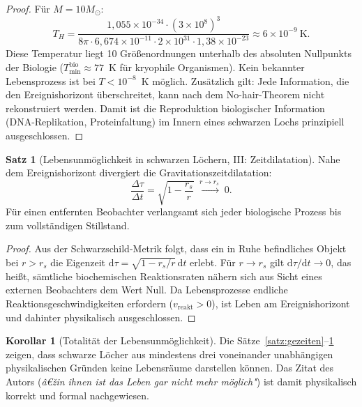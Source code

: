 ﻿\documentclass[a4paper,12pt]{article}
\theoremstyle{definition}
\newtheorem{satz}{Satz}
\newtheorem{korollar}{Korollar}
\begin{document}
\begin{proof}
    Für $M = 10 M_\odot$:
    \[
        T_H = \frac{1{,}055\times10^{-34} \cdot (3\times10^8)^3}
              {8\pi \cdot 6{,}674\times10^{-11} \cdot 2\times10^{31}
              \cdot 1{,}38\times10^{-23}}
        \approx 6 \times 10^{-9}~\text{K}.
    \]
    Diese Temperatur liegt 10 Größenordnungen unterhalb des
    absoluten Nullpunkts der Biologie ($T_{\min}^{\text{bio}} \approx 77$~K
    für kryophile Organismen). Kein bekannter Lebensprozess ist bei
    $T < 10^{-8}$~K möglich. Zusätzlich gilt: Jede Information, die den
    Ereignishorizont überschreitet, kann nach dem
    No-hair-Theorem nicht rekonstruiert werden. Damit ist die
    Reproduktion biologischer Information (DNA-Replikation, Proteinfaltung)
    im Innern eines schwarzen Lochs prinzipiell ausgeschlossen. \qedhere
\end{proof}

\begin{satz}[Lebensunmöglichkeit in schwarzen Löchern, III: Zeitdilatation]
\label{satz:zeitdilatation}
    Nahe dem Ereignishorizont divergiert die Gravitationszeitdilatation:
    \[
        \frac{\Delta \tau}{\Delta t} = \sqrt{1 - \frac{r_s}{r}} \;\xrightarrow{r \to r_s}\; 0.
    \]
    Für einen entfernten Beobachter verlangsamt sich jeder biologische
    Prozess bis zum vollständigen Stillstand.
\end{satz}

\begin{proof}
    Aus der Schwarzschild-Metrik folgt, dass ein in Ruhe befindliches
    Objekt bei $r > r_s$ die Eigenzeit
    $\mathrm{d}\tau = \sqrt{1 - r_s/r}\,\mathrm{d}t$
    erlebt. Für $r \to r_s$ gilt $\mathrm{d}\tau/\mathrm{d}t \to 0$,
    das heißt, sämtliche biochemischen Reaktionsraten nähern sich aus Sicht
    eines externen Beobachters dem Wert Null. Da Lebensprozesse endliche
    Reaktionsgeschwindigkeiten erfordern ($v_{\text{reakt}} > 0$), ist Leben
    am Ereignishorizont und dahinter physikalisch ausgeschlossen. \qedhere
\end{proof}

\begin{korollar}[Totalität der Lebensunmöglichkeit]
    Die Sätze~\ref{satz:gezeiten}--\ref{satz:zeitdilatation} zeigen, dass
    schwarze Löcher aus mindestens drei voneinander unabhängigen physikalischen
    Gründen keine Lebensräume darstellen können. Das Zitat des Autors
    (\emph{â€žin ihnen ist das Leben gar nicht mehr möglich"}) ist damit
    physikalisch korrekt und formal nachgewiesen.
\end{korollar}
\end{document}
